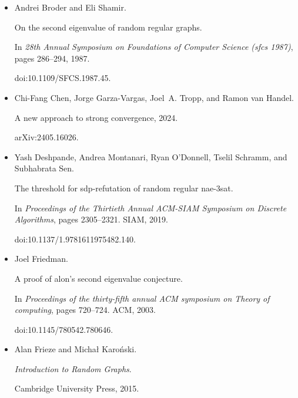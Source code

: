 \documentclass[10pt,a4paper]{article}
\begin{document}
\begin{itemize}
doi:10.1109/FOCS.2015.86.





\item[] 
[10]

Andrei Broder and Eli Shamir.


On the second eigenvalue of random regular graphs.


In \emph{28th Annual Symposium on Foundations of Computer Science
(sfcs 1987)}, pages 286–294, 1987.


doi:10.1109/SFCS.1987.45.





\item[] 
[11]

Chi-Fang Chen, Jorge Garza-Vargas, Joel A. Tropp, and Ramon van Handel.


A new approach to strong convergence, 2024.


arXiv:2405.16026.





\item[] 
[12]

Yash Deshpande, Andrea Montanari, Ryan O’Donnell, Tselil Schramm, and
Subhabrata Sen.


The threshold for sdp-refutation of random regular nae-3sat.


In \emph{Proceedings of the Thirtieth Annual ACM-SIAM Symposium on
Discrete Algorithms}, pages 2305–2321. SIAM, 2019.


doi:10.1137/1.9781611975482.140.





\item[] 
[13]

Joel Friedman.


A proof of alon’s second eigenvalue conjecture.


In \emph{Proceedings of the thirty-fifth annual ACM symposium on
Theory of computing}, pages 720–724. ACM, 2003.


doi:10.1145/780542.780646.





\item[] 
[14]

Alan Frieze and Michał Karoński.


\emph{Introduction to Random Graphs}.


Cambridge University Press, 2015.






\end{itemize}
\end{document}
